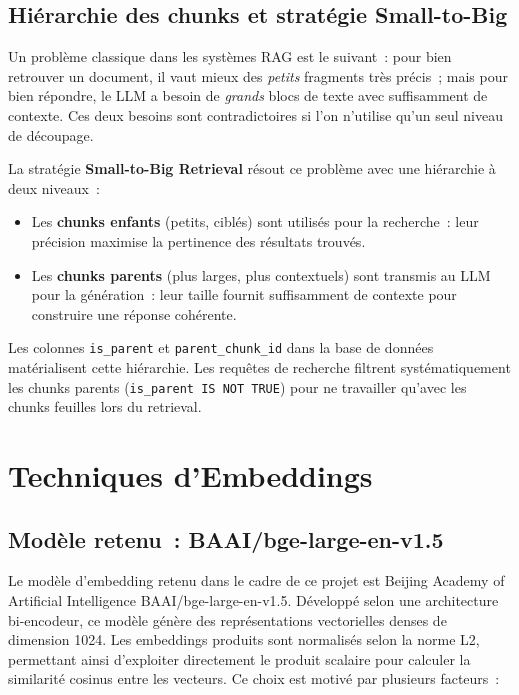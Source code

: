 \subsection{Hiérarchie des chunks et stratégie Small-to-Big}

Un problème classique dans les systèmes RAG est le suivant~: pour bien retrouver un document, il vaut mieux des \emph{petits} fragments très précis~; mais pour bien répondre, le LLM a besoin de \emph{grands} blocs de texte avec suffisamment de contexte. Ces deux besoins sont contradictoires si l'on n'utilise qu'un seul niveau de découpage.

La stratégie \textbf{Small-to-Big Retrieval} résout ce problème avec une hiérarchie à deux niveaux~:
\begin{itemize}
  \item Les \textbf{chunks enfants} (petits, ciblés) sont utilisés pour la recherche~: leur précision maximise la pertinence des résultats trouvés.
  \item Les \textbf{chunks parents} (plus larges, plus contextuels) sont transmis au LLM pour la génération~: leur taille fournit suffisamment de contexte pour construire une réponse cohérente.
\end{itemize}

Les colonnes \texttt{is\_parent} et \texttt{parent\_chunk\_id} dans la base de données matérialisent cette hiérarchie. Les requêtes de recherche filtrent systématiquement les chunks parents (\texttt{is\_parent IS NOT TRUE}) pour ne travailler qu'avec les chunks feuilles lors du retrieval.

\section{Techniques d'Embeddings}

\subsection{Modèle retenu~: BAAI/bge-large-en-v1.5}
Le modèle d’embedding retenu dans le cadre de ce projet est Beijing Academy of Artificial Intelligence BAAI/bge-large-en-v1.5. Développé selon une architecture bi-encodeur, ce modèle génère des représentations vectorielles denses de dimension 1024. Les embeddings produits sont normalisés selon la norme L2, permettant ainsi d’exploiter directement le produit scalaire pour calculer la similarité cosinus entre les vecteurs.
Ce choix est motivé par plusieurs facteurs~:

